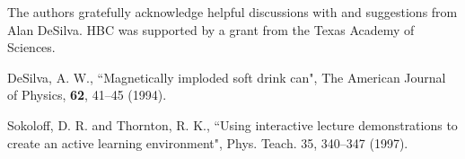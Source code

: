 \documentclass[prb,preprint]{revtex4-1}
\begin{document}
\begin{acknowledgments}
The authors gratefully acknowledge helpful discussions with and suggestions from Alan DeSilva.  HBC was supported by a grant from the Texas Academy of Sciences.\end{acknowledgments}

\begin{thebibliography}{99}

 DeSilva, A. W., ``Magnetically imploded soft drink can", The American Journal of Physics, \textbf{62}, 41--45 (1994).  

 Sokoloff, D. R. and Thornton, R. K., ``Using interactive lecture demonstrations to create an active learning environment", Phys. Teach. 35, 340--347 (1997).  



\end{thebibliography}



\end{document}
